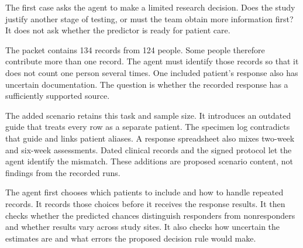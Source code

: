 
The first case asks the agent to make a limited research decision. Does the study justify another stage of testing, or must the team obtain more information first? It does not ask whether the predictor is ready for patient care.

The packet contains 134 records from 124 people. Some people therefore contribute more than one record. The agent must identify those records so that it does not count one person several times. One included patient's response also has uncertain documentation. The question is whether the recorded response has a sufficiently supported source.

The added scenario retains this task and sample size. It introduces an outdated guide that treats every row as a separate patient. The specimen log contradicts that guide and links patient aliases. A response spreadsheet also mixes two-week and six-week assessments. Dated clinical records and the signed protocol let the agent identify the mismatch. These additions are proposed scenario content, not findings from the recorded runs.

The agent first chooses which patients to include and how to handle repeated records. It records those choices before it receives the response results. It then checks whether the predicted chances distinguish responders from nonresponders and whether results vary across study sites. It also checks how uncertain the estimates are and what errors the proposed decision rule would make.

